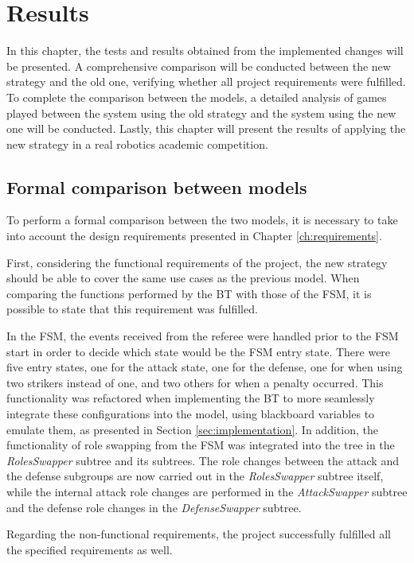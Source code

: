 \chapter{Results}
\label{ch:results}

In this chapter, the tests and results obtained from the implemented changes will be presented. A comprehensive comparison will be conducted between the new strategy and the old one, verifying whether all project requirements were fulfilled. To complete the comparison between the models, a detailed analysis of games played between the system using the old strategy and the system using the new one will be conducted. Lastly, this chapter will present the results of applying the new strategy in a real robotics academic competition.

\section{Formal comparison between models}

To perform a formal comparison between the two models, it is necessary to take into account the design requirements presented in Chapter \ref{ch:requirements}.

First, considering the functional requirements of the project, the new strategy should be able to cover the same use cases as the previous model. When comparing the functions performed by the BT with those of the FSM, it is possible to state that this requirement was fulfilled.

In the FSM, the events received from the referee were handled prior to the FSM start in order to decide which state would be the FSM entry state. There were five entry states, one for the attack state, one for the defense, one for when using two strikers instead of one, and two others for when a penalty occurred. This functionality was refactored when implementing the BT to more seamlessly integrate these configurations into the model, using blackboard variables to emulate them, as presented in Section \ref{sec:implementation}. In addition, the functionality of role swapping from the FSM was integrated into the tree in the \textit{RolesSwapper} subtree and its subtrees. The role changes between the attack and the defense subgroups are now carried out in the \textit{RolesSwapper} subtree itself, while the internal attack role changes are performed in the \textit{AttackSwapper} subtree and the defense role changes in the \textit{DefenseSwapper} subtree.

Regarding the non-functional requirements, the project successfully fulfilled all the specified requirements as well.


